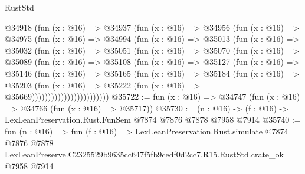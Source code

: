 \begin{lexlean}{RustStd}
\begin{coremodule}
                @34918
                  (fun (x : @16) =>
                  @34937
                    (fun (x : @16) =>
                    @34956
                      (fun (x : @16) =>
                      @34975
                        (fun (x : @16) =>
                        @34994
                          (fun (x : @16) =>
                          @35013
                            (fun (x : @16) =>
                            @35032
                              (fun (x : @16) =>
                              @35051
                                (fun (x : @16) =>
                                @35070
                                  (fun (x : @16) =>
                                  @35089
                                    (fun (x : @16) =>
                                    @35108
                                      (fun (x : @16) =>
                                      @35127
                                        (fun (x : @16) =>
                                        @35146
                                          (fun (x : @16) =>
                                          @35165
                                            (fun (x : @16) =>
                                            @35184
                                              (fun (x : @16) =>
                                              @35203
                                                (fun (x : @16) =>
                                                @35222
                                                  (fun (x : @16) => @35669))))))))))))))))))))))))
@35722 := fun (x : @16) => @34747 (fun (x : @16) => @34766 (fun (x : @16) => @35717))
@35730 := (n : @16) -> (f : @16) -> LexLeanPreservation.Rust.FunSem @7874 @7876 @7878 @7958 @7914
@35740 := fun (n : @16) =>
  fun (f : @16) =>
  LexLeanPreservation.Rust.simulate
    @7874
    @7876
    @7878
    LexLeanPreserve.C2325529b9635cc647f5fb9cedf0d2cc7.R15.RustStd.crate_ok
    @7958
    @7914
\end{coremodule}
\end{lexlean}
